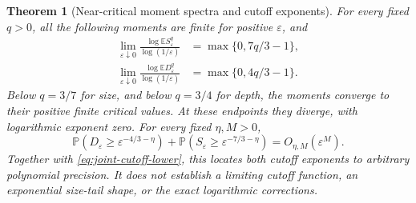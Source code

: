 \documentclass[11pt]{article}
\numberwithin{equation}{section}
\newtheorem{theorem}{Theorem}[section]
\theoremstyle{definition}
\newcommand{\E}{\mathbb E}
\newcommand{\Prob}{\mathbb P}
\begin{document}
\begin{theorem}[Near-critical moment spectra and cutoff exponents]\label{thm:near-critical-spectrum}
For every fixed $q>0$, all the following moments are finite for positive $\varepsilon$, and
\begin{align}
 \lim_{\varepsilon\downarrow0}
 \frac{\log\E S_\varepsilon^q}{\log(1/\varepsilon)}
 &=\max\{0,7q/3-1\},\label{eq:depleted-size-spectrum}\\
 \lim_{\varepsilon\downarrow0}
 \frac{\log\E D_\varepsilon^q}{\log(1/\varepsilon)}
 &=\max\{0,4q/3-1\}.\label{eq:depleted-depth-spectrum}
\end{align}
Below $q=3/7$ for size, and below $q=3/4$ for depth, the moments converge to their positive finite critical values. At these endpoints they diverge, with logarithmic exponent zero. For every fixed $\eta,M>0$,
\begin{equation}\label{eq:depleted-cutoff-upper}
 \Prob(D_\varepsilon\ge\varepsilon^{-4/3-\eta})
 +\Prob(S_\varepsilon\ge\varepsilon^{-7/3-\eta})
 =O_{\eta,M}(\varepsilon^M).
\end{equation}
Together with \eqref{eq:joint-cutoff-lower}, this locates both cutoff exponents to arbitrary polynomial precision. It does not establish a limiting cutoff function, an exponential size-tail shape, or the exact logarithmic corrections.
\end{theorem}
\end{document}
